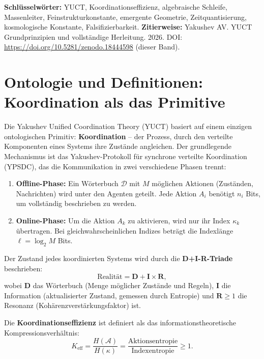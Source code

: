 \documentclass[12pt,a4paper]{article}
\newcommand{\Keff}{K_{\mathrm{eff}}}
\begin{document}
	\vspace{0.1cm}
	\noindent
	{\color{darkblue}\textbf{Schlüsselwörter:}} YUCT, Koordinationseffizienz, algebraische Schleife, Massenleiter, Feinstrukturkonstante, emergente Geometrie, Zeitquantisierung, kosmologische Konstante, Falsifizierbarkeit.
	\vspace{0.1cm}
	\noindent
	{\color{darkblue}\textbf{Zitierweise:}} Yakushev AV. YUCT Grundprinzipien und vollständige Herleitung. 2026. DOI: \url{https://doi.org/10.5281/zenodo.18444598} (dieser Band).
	
	\vspace{0.4cm}
	
	\section{Ontologie und Definitionen: Koordination als das Primitive}
	\label{sec:ontology}
	
	Die Yakushev Unified Coordination Theory (YUCT) basiert auf einem einzigen ontologischen Primitiv: \textbf{Koordination} – der Prozess, durch den verteilte Komponenten eines Systems ihre Zustände angleichen. Der grundlegende Mechanismus ist das Yakushev-Protokoll für synchrone verteilte Koordination (YPSDC), das die Kommunikation in zwei verschiedene Phasen trennt:
	\begin{enumerate}
		\item \textbf{Offline-Phase:} Ein Wörterbuch \(\mathcal{D}\) mit \(M\) möglichen Aktionen (Zuständen, Nachrichten) wird unter den Agenten geteilt. Jede Aktion \(A_i\) benötigt \(n_i\) Bits, um vollständig beschrieben zu werden.
		\item \textbf{Online-Phase:} Um die Aktion \(A_k\) zu aktivieren, wird nur ihr Index \(\kappa_k\) übertragen. Bei gleichwahrscheinlichen Indizes beträgt die Indexlänge \(\ell = \log_2 M\) Bits.
	\end{enumerate}
	
	Der Zustand jedes koordinierten Systems wird durch die \textbf{D+I-R-Triade} beschrieben:
	\[
	\text{Realität} = \mathbf{D} + \mathbf{I} \times \mathbf{R},
	\]
	wobei \(\mathbf{D}\) das Wörterbuch (Menge möglicher Zustände und Regeln), \(\mathbf{I}\) die Information (aktualisierter Zustand, gemessen durch Entropie) und \(\mathbf{R} \ge 1\) die Resonanz (Kohärenzverstärkungsfaktor) ist.
	
	Die \textbf{Koordinationseffizienz} ist definiert als das informationstheoretische Kompressionsverhältnis:
	\begin{equation}
		\Keff = \frac{H(\mathcal{A})}{H(\kappa)} = \frac{\text{Aktionsentropie}}{\text{Indexentropie}} \ge 1.
		\label{eq:keff-def}
	\end{equation}
	
\end{document}
